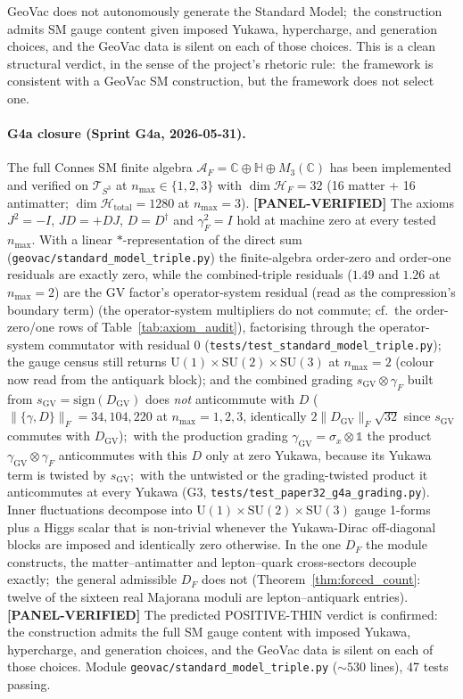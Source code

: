 \documentclass[11pt]{article}
\begin{document}
GeoVac does not autonomously generate the Standard Model;\ the
construction admits SM gauge content given imposed Yukawa,
hypercharge, and generation choices, and the GeoVac data is silent
on each of those choices.  This is a clean structural verdict, in
the sense of the project's rhetoric rule:\ the framework is consistent with a
GeoVac SM construction, but the framework does not select one.

\paragraph{G4a closure (Sprint G4a, 2026-05-31).}
The full Connes SM finite algebra
$\mathcal{A}_F = \mathbb{C} \oplus \mathbb{H} \oplus M_3(\mathbb{C})$
has been implemented and verified on
$\mathcal{T}_{S^3}$ at $n_{\max} \in \{1, 2, 3\}$ with
$\dim \mathcal{H}_F = 32$ (16 matter + 16 antimatter;
$\dim \mathcal{H}_{\text{total}} = 1280$ at $n_{\max} = 3$).
\textbf{[PANEL-VERIFIED]} The axioms $J^2 = -I$, $JD = +DJ$, $D = D^\dagger$
and $\gamma_F^2 = I$ hold at machine zero at every tested $n_{\max}$.
With a linear $*$-representation of the direct sum
(\texttt{geovac/standard\_model\_triple.py}) the finite-algebra
order-zero and order-one residuals are exactly zero, while the combined-triple residuals ($1.49$ and $1.26$ at
$n_{\max} = 2$) are the GV factor's operator-system residual (read as the compression's boundary term) (the operator-system
multipliers do not commute; cf.\ the order-zero/one rows of
Table~\ref{tab:axiom_audit}), factorising through the
operator-system commutator with residual $0$ (\texttt{tests/test\_standard\_model\_triple.py});
the gauge census still returns $\mathrm{U}(1) \times \mathrm{SU}(2)
\times \mathrm{SU}(3)$ at $n_{\max} = 2$ (colour now read from the
antiquark block); and the combined grading
$s_{\mathrm{GV}} \otimes \gamma_F$ built from $s_{\mathrm{GV}} =
\mathrm{sign}(D_{\mathrm{GV}})$ does \emph{not} anticommute with $D$
($\|\{\gamma, D\}\|_F = 34, 104, 220$ at $n_{\max} = 1, 2, 3$, identically
$2\|D_{\mathrm{GV}}\|_F\sqrt{32}$ since $s_{\mathrm{GV}}$ commutes with
$D_{\mathrm{GV}}$);\ with the
production grading $\gamma_{\mathrm{GV}} = \sigma_x \otimes \mathbb{1}$
the product $\gamma_{\mathrm{GV}} \otimes \gamma_F$ anticommutes with this
$D$ only at zero Yukawa, because its Yukawa term is twisted by
$s_{\mathrm{GV}}$;\ with the untwisted or the grading-twisted product it
anticommutes at every Yukawa (G3,
\texttt{tests/test\_paper32\_g4a\_grading.py}).
Inner fluctuations decompose into
$\mathrm{U}(1) \times \mathrm{SU}(2) \times \mathrm{SU}(3)$
gauge 1-forms plus a Higgs scalar that is non-trivial whenever the
Yukawa-Dirac off-diagonal blocks are imposed and identically zero
otherwise.  In the one $D_F$ the module constructs, the
matter--antimatter and lepton--quark cross-sectors decouple exactly;\ the
general admissible $D_F$ does not (Theorem~\ref{thm:forced_count}: twelve
of the sixteen real Majorana moduli are lepton--antiquark entries).  \textbf{[PANEL-VERIFIED]} The predicted POSITIVE-THIN verdict is confirmed:
the construction admits the full SM gauge content with imposed
Yukawa, hypercharge, and generation choices, and the GeoVac data is
silent on each of those choices.
Module \texttt{geovac/standard\_model\_triple.py} ($\sim 530$ lines),
47 tests passing.
\end{document}
